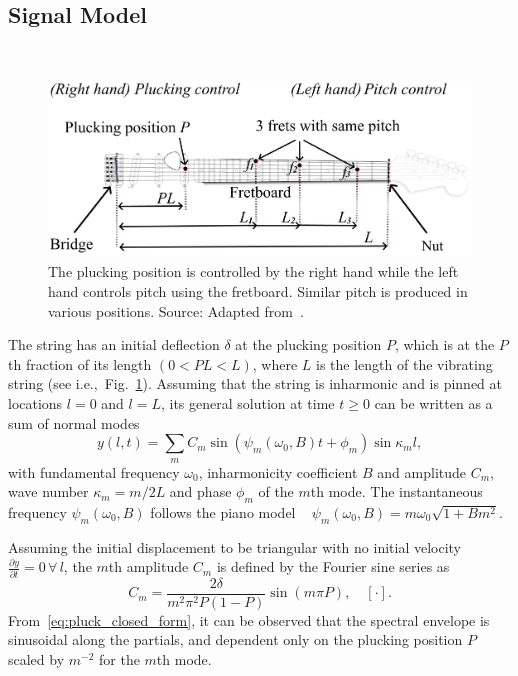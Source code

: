 \documentclass{article}
\begin{document}
\begin{sloppy}
\section{Signal Model}
%
\begin{figure}[t]\
  \centering
  \centerline{\includegraphics[width=.95\columnwidth]{img/fender_drawing5.png}}
  \caption{The plucking position is controlled by the right hand while the left hand controls pitch using the fretboard. Similar pitch is produced in various positions. Source: Adapted from~\cite{phillips}.
  }\label{fig:guitar_overview}\vspace{-2mm}
\end{figure}
%
The string has an initial deflection $\delta$ at the plucking position $P$, which is at the $P$th fraction of its length $(0<PL<L)$, where $L$ is the length of the vibrating string (see i.e.,~Fig.~\ref{fig:guitar_overview}). Assuming that the string is inharmonic and is pinned at locations $l=0$ and $l=L$, its general solution at time $t\geq0$ can be written as a sum of normal modes~\cite{fletcher:physics_of_musical_instruments}
%
\begin{equation}\label{eq:modalSum}
    y(l,t) = \sum_m C_m\sin(\psi_m(\omega_0,B)t+\phi_m)\sin\kappa_ml,
\end{equation}
%
with fundamental frequency $\omega_0$, inharmonicity coefficient $B$ and amplitude $C_m$, wave number $\kappa_m = m/ 2L$ and phase $\phi_m$ of the $m$th mode. The instantaneous frequency $\psi_m(\omega_0,B)$ follows the piano model ~\cite{fletcher:piano_model} 
$  \psi_m(\omega_0,B) = m \omega_0 \sqrt{1+B m^2}$. %

Assuming the initial displacement to be triangular with no initial velocity $\frac{\partial y}{\partial t} = 0 \, \forall\, l$, the $m$th amplitude $C_m$ is defined by the Fourier sine series as~\cite{donkin:acoustics,fletcher:principles_of_vibration_and_sound}
\begin{equation}\label{eq:pluck_closed_form}
    C_m = \frac{2\delta}{m^2\pi^2P(1-P)}\sin(m\pi P), \quad [\cdot].
\end{equation}
From~\eqref{eq:pluck_closed_form}, it can be observed that the spectral envelope is sinusoidal along the partials, and dependent only on the plucking position $P$ scaled by $m^{-2}$ for the $m$th mode.


\end{sloppy}
\end{document}

